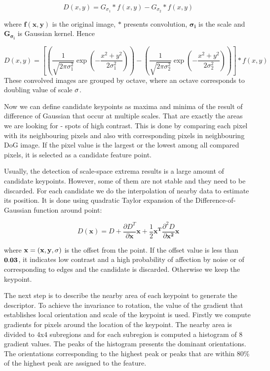 \[ D(x, y) = G_{\sigma_1} * f(x, y) - G_{\sigma_2} * f(x, y) \]


where $\mathbf{f(x, y)}$ is the original image, $\mathbf{*}$ presents convolution, $\mathbf{\sigma_i}$ is the scale and $\mathbf{G_{\sigma_i}}$ is Gaussian kernel. Hence
\pagebreak

\[
D(x, y) = 
\left[
\left( \frac{1}{\sqrt{2\pi \sigma _1^{2}}}\exp\left ( -\frac{x^{2}+y^{2}}{2\sigma_1^{2}} \right ) \right) -
\left( \frac{1}{\sqrt{2\pi \sigma _2^{2}}}\exp\left ( -\frac{x^{2}+y^{2}}{2\sigma_2^{2}} \right ) \right )
 \right ] * f(x, y)
\]
These convolved images are grouped by octave, where an octave corresponds to doubling value of scale $\mathbf{\sigma}$.

Now we can define candidate keypoints as maxima and minima of the result of difference of Gaussian that occur at multiple scales.
That are exactly the areas we are looking for -  spots of high contrast.
This is done by comparing each pixel with its neighbouring pixels and also with corresponding pixels in neighbouring DoG image. 
If the pixel value is the largest or the lowest among all compared pixels, it is selected as a candidate feature point.

Usually, the detection of scale-space extrema results is a large amount of candidate keypoints.
However, some of them are not stable and they need to be discarded.
For each candidate we do the interpolation of nearby data to estimate its position.
It is done using quadratic Taylor expansion of the Difference-of-Gaussian function around point:

\[
D(\mathbf{x}) = D + \frac{\partial D^{T}}{\partial \mathbf{x}}\mathbf{x} + \frac{1}{2}\mathbf{x^{T}}\frac{\partial ^{2}D}{\partial \mathbf{x^{2}}}\mathbf{x}
\]

where $\mathbf{\mathbf{x} = (x, y, \sigma)}$ is the offset from the point.
If the offset value is less than $\mathbf{0.03}$, it indicates low contrast and a high probability of affection by noise or of corresponding to edges and the candidate is discarded.
Otherwise we keep the keypoint.

The next step is to describe the nearby area of each keypoint to generate the descriptor. 
To achieve the invariance to rotation, the value of the gradient that establishes local orientation and scale of the keypoint is used.
Firstly we compute gradients for pixels around the location of the keypoint.
The nearby area is divided to 4x4 subregions and for each subregion is computed a histogram of 8 gradient values.
The peaks of the histogram presents the dominant orientations.
The orientations corresponding to the highest peak or peaks that are within 80\% of the highest peak are assigned to the feature.

